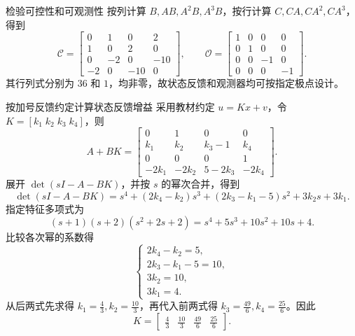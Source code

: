 \documentclass[11pt]{article}
\begin{document}
\begin{solution}
\begin{proofstep}{检验可控性和可观测性}
按列计算 $B,AB,A^2B,A^3B$，按行计算 $C,CA,CA^2,CA^3$，得到
\[
 \mathcal C=\begin{bmatrix}0&1&0&2\\1&0&2&0\\0&-2&0&-10\\-2&0&-10&0\end{bmatrix},\qquad
 \mathcal O=\begin{bmatrix}1&0&0&0\\0&1&0&0\\0&0&-1&0\\0&0&0&-1\end{bmatrix}.
\]
其行列式分别为 $36$ 和 $1$，均非零，故状态反馈和观测器均可按指定极点设计。
\end{proofstep}
\begin{proofstep}{按加号反馈约定计算状态反馈增益}
采用教材约定 $u=Kx+v$，令 $K=[k_1\;k_2\;k_3\;k_4]$，则
\[
 A+BK=\begin{bmatrix}
 0&1&0&0\\k_1&k_2&k_3-1&k_4\\
 0&0&0&1\\-2k_1&-2k_2&5-2k_3&-2k_4
 \end{bmatrix}.
\]
展开 $\det(sI-A-BK)$，并按 $s$ 的幂次合并，得到
\[
 \det(sI-A-BK)
 =s^4+(2k_4-k_2)s^3+(2k_3-k_1-5)s^2+3k_2s+3k_1.
\]
指定特征多项式为
\[
 (s+1)(s+2)(s^2+2s+2)=s^4+5s^3+10s^2+10s+4.
\]
比较各次幂的系数得
\[
 \begin{cases}
 2k_4-k_2=5,\\
 2k_3-k_1-5=10,\\
 3k_2=10,\\
 3k_1=4.
 \end{cases}
\]
从后两式先求得 $k_1=\tfrac43,k_2=\tfrac{10}3$，再代入前两式得
$k_3=\tfrac{49}6,k_4=\tfrac{25}6$。因此
\[
 \boxed{K=\begin{bmatrix}\frac43&\frac{10}3&\frac{49}6&\frac{25}6\end{bmatrix}.}
\]
\end{proofstep}


\end{solution}
\end{document}
